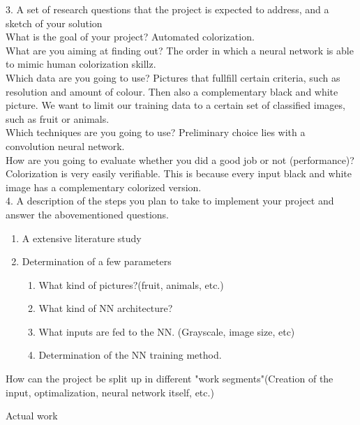 3. A set of research questions that the project is expected to address, and a sketch of your solution\\
What is the goal of your project? Automated colorization.\\
What are you aiming at finding out? The order in which a neural network is able to mimic human colorization skillz. \\
Which data are you going to use? Pictures that fullfill certain criteria, such as resolution and amount of colour. Then also a complementary black and white picture.
We want to limit our training data to a certain set of classified images, such as fruit or animals.\\
Which techniques are you going to use? Preliminary choice lies with a convolution neural network.\\
How are you going to evaluate whether you did a good job or not (performance)? Colorization is very easily verifiable. This is because every input black and white image has a complementary colorized version.\\
4. A description of the steps you plan to take to implement your project and answer the abovementioned questions. \\
\begin{enumerate}
\item	A extensive literature study\\
\item	Determination of a few parameters\\
	\begin{enumerate}
		\item What kind of pictures?(fruit, animals, etc.)
		\item What kind of NN architecture? 
		\item What inputs are fed to the NN. (Grayscale, image size, etc)
		\item Determination of the NN training method. 
	\end{enumerate}
\end{enumerate}		
\item How can the project be split up in different "work segments"(Creation of the input, optimalization, neural network itself, etc.)
\item Actual work
